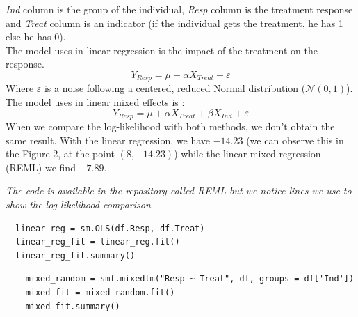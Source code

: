 \documentclass{article}
\begin{document}
\textit{Ind} column is the group of the individual, \textit{Resp} column is the treatment response and \textit{Treat} column is an indicator (if the individual gets the treatment, he has 1 else he has 0).\\
The model uses in linear regression is the impact of the treatment on the response.
\begin{equation*}
    Y_{Resp} = \mu +  \alpha X_{Treat} + \varepsilon
\end{equation*}
Where $\varepsilon$ is a noise following a centered, reduced Normal distribution ($\mathcal{N}(0, 1)$).\\
The model uses in linear mixed effects is :
\begin{equation*}
    Y_{Resp} = \mu + \alpha X_{Treat}  + \beta X_{Ind} +\varepsilon
\end{equation*}
When we compare the log-likelihood with both methods, we don't obtain the same result.
With the linear regression, we have $-14.23$ (we can observe this in the Figure 2, at the point $(8, -14.23)$) while the linear mixed regression (REML) we find $-7.89$.\\
\begin{remark}
\textit{The code is available in the repository called REML but we notice lines we use to show the log-likelihood comparison}
\end{remark}
\begin{lstlisting}
  linear_reg = sm.OLS(df.Resp, df.Treat)
  linear_reg_fit = linear_reg.fit()
  linear_reg_fit.summary()
\end{lstlisting}
\begin{lstlisting}
    mixed_random = smf.mixedlm("Resp ~ Treat", df, groups = df['Ind'])
    mixed_fit = mixed_random.fit()
    mixed_fit.summary() 
\end{lstlisting}
\end{document}
